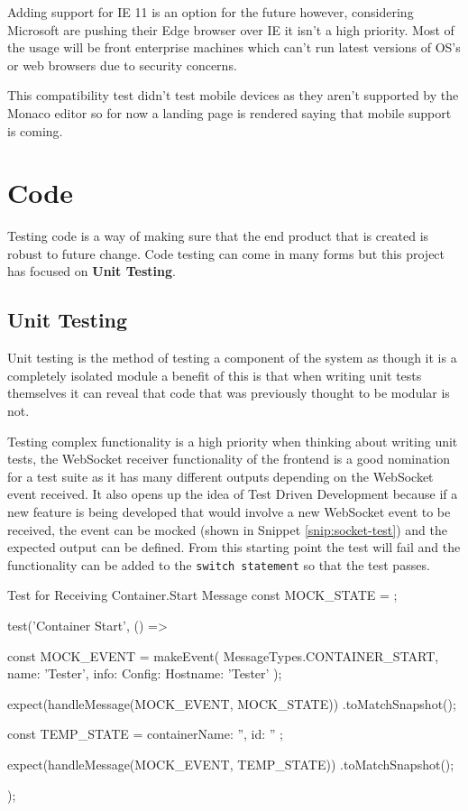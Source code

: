 Adding support for IE 11 is an option for the future however, considering Microsoft are pushing their Edge browser over IE it isn't a high priority. Most of the usage will be front enterprise machines which can't run latest versions of OS's or web browsers due to security concerns.

This compatibility test didn't test mobile devices as they aren't supported by the Monaco editor so for now a landing page is rendered saying that mobile support is coming.

\section{Code}

Testing code is a way of making sure that the end product that is created is robust to future change. Code testing can come in many forms but this project has focused on \textbf{Unit Testing}.

\subsection{Unit Testing} \label{test:unit}

Unit testing is the method of testing a component of the system as though it is a completely isolated module a benefit of this is that when writing unit tests themselves it can reveal that code that was previously thought to be modular is not. 

Testing complex functionality is a high priority when thinking about writing unit tests, the WebSocket receiver functionality of the frontend is a good nomination for a test suite as it has many different outputs depending on the WebSocket event received. It also opens up the idea of Test Driven Development because if a new feature is being developed that would involve a new WebSocket event to be received, the event can be mocked (shown in Snippet \ref{snip:socket-test}) and the expected output can be defined. From this starting point the test will fail and the functionality can be added to the \texttt{switch statement} so that the test passes.

\begin{sexylisting}[label=snip:socket-test]{Test for Receiving Container.Start Message}
const MOCK_STATE = {};

test('Container Start', () => {
    const MOCK_EVENT = makeEvent(
        MessageTypes.CONTAINER_START, {
            name: 'Tester',
            info: { Config: { Hostname: 'Tester' } }
        });

    expect(handleMessage(MOCK_EVENT, MOCK_STATE))
        .toMatchSnapshot();

    const TEMP_STATE = { containerName: '', id: '' };

    expect(handleMessage(MOCK_EVENT, TEMP_STATE))
        .toMatchSnapshot();
});
\end{sexylisting}

